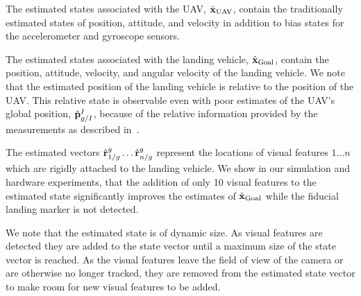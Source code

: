 The estimated states associated with the UAV, $\hat{\boldsymbol{\mathrm{x}}}_{\text{UAV}}$,
contain the traditionally estimated states of position, attitude, and velocity
in addition to bias states for the accelerometer and gyroscope sensors.

The estimated states associated with the landing vehicle,
$\hat{\boldsymbol{\mathrm{x}}}_{\text{Goal}}$, contain the position, attitude, velocity, and
angular velocity of the landing vehicle.
We note that the
estimated position of the landing vehicle is relative to the position of the
UAV. This relative state is observable even with poor estimates of the UAV's global
position, $\hat{\boldsymbol{\mathrm{p}}}_{g/I}^I$, because of the relative information provided
by the measurements as described in~.

The estimated vectors $\hat{\boldsymbol{\mathrm{r}}}_{1/g}^{g} \dots \hat{\boldsymbol{\mathrm{r}}}_{n/g}^{g}$ represent the
locations of visual features $1 \dots n$ which are rigidly attached to the
landing vehicle. We show in our simulation and hardware experiments, that the
addition of only 10 visual features to the estimated state significantly
improves the estimates of $\hat{\boldsymbol{\mathrm{x}}}_{\text{Goal}}$
while the fiducial landing marker is not detected. 

We note
that the estimated state is of dynamic size. As visual features are
detected they are added to the state vector until a maximum size of the state
vector is reached. As the visual features leave the field of view of the camera
or are otherwise no longer tracked, they are removed from the estimated state
vector to make room for new visual features to be added.


